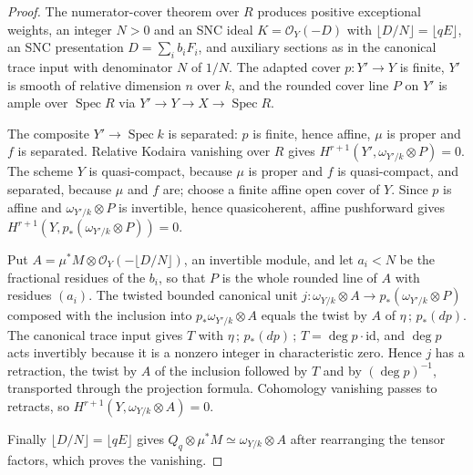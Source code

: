 \begin{proof}
The numerator-cover theorem over $R$ produces positive exceptional weights,
an integer $N>0$ and an SNC ideal $K=\mathcal O_Y(-D)$ with
$\lfloor D/N\rfloor=\lfloor qE\rfloor$, an SNC presentation
$D=\sum_i b_iF_i$, and auxiliary sections as in the canonical trace input with
denominator $N$ of $1/N$. The adapted cover $p:Y'\to Y$ is finite, $Y'$ is
smooth of relative dimension $n$ over $k$, and the rounded cover line $P$ on
$Y'$ is ample over $\operatorname{Spec}R$ via $Y'\to Y\to X\to\operatorname{Spec}R$.

The composite $Y'\to\operatorname{Spec}k$ is separated: $p$ is finite, hence
affine, $\mu$ is proper and $f$ is separated. Relative Kodaira vanishing
over $R$ gives $H^{r+1}(Y',\omega_{Y'/k}\otimes P)=0$. The scheme $Y$ is
quasi-compact, because $\mu$ is proper and $f$ is quasi-compact, and separated,
because $\mu$ and $f$ are; choose a finite affine open cover of $Y$. Since $p$
is affine and $\omega_{Y'/k}\otimes P$ is invertible, hence quasicoherent,
affine pushforward gives
$H^{r+1}(Y,p_*(\omega_{Y'/k}\otimes P))=0$.

Put $A=\mu^*M\otimes\mathcal O_Y(-\lfloor D/N\rfloor)$, an invertible module,
and let $a_i<N$ be the fractional residues of the $b_i$, so that $P$ is the
whole rounded line of $A$ with residues $(a_i)$. The twisted bounded canonical
unit $j:\omega_{Y/k}\otimes A\to p_*(\omega_{Y'/k}\otimes P)$ composed with the
inclusion into $p_*\omega_{Y'/k}\otimes A$ equals the twist by $A$ of
$\eta\,;\,p_*(dp)$. The canonical trace input gives $T$ with
$\eta\,;\,p_*(dp)\,;\,T=\deg p\cdot\mathrm{id}$, and $\deg p$ acts invertibly
because it is a nonzero integer in characteristic zero. Hence $j$ has a
retraction, the twist by $A$ of the inclusion followed by $T$ and by
$(\deg p)^{-1}$, transported through the projection formula. Cohomology
vanishing passes to retracts, so $H^{r+1}(Y,\omega_{Y/k}\otimes A)=0$.

Finally $\lfloor D/N\rfloor=\lfloor qE\rfloor$ gives
$Q_q\otimes\mu^*M\simeq\omega_{Y/k}\otimes A$ after rearranging the tensor
factors, which proves the vanishing.
\end{proof}

